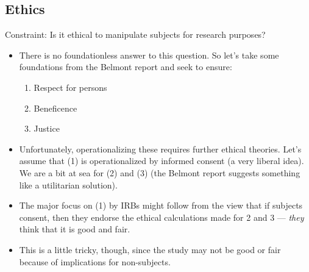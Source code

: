 \documentclass[
  11pt,
  ignorenonframetext,
]{beamer}
\providecommand{\tightlist}{%
  \setlength{\itemsep}{0pt}\setlength{\parskip}{0pt}}\usepackage{longtable,booktabs,array}
\begin{document}
\hypertarget{ethics}{%
\subsection{\texorpdfstring{Ethics
\label{ethics}}{Ethics }}\label{ethics}}

\begin{frame}{Constraint: Is it ethical to manipulate subjects for
research purposes?}
\protect\hypertarget{constraint-is-it-ethical-to-manipulate-subjects-for-research-purposes}{}
\begin{itemize}
\item
  There is no foundationless answer to this question. So let's take some
  foundations from the Belmont report and seek to ensure:

  \begin{enumerate}
  \tightlist
  \item
    Respect for persons
  \item
    Beneficence
  \item
    Justice
  \end{enumerate}
\item
  Unfortunately, operationalizing these requires further ethical
  theories. Let's assume that (1) is operationalized by informed consent
  (a very liberal idea). We are a bit at sea for (2) and (3) (the
  Belmont report suggests something like a utilitarian solution).
\item
  The major focus on (1) by IRBs might follow from the view that if
  subjects consent, then they endorse the ethical calculations made for
  2 and 3 --- \emph{they} think that it is good and fair.
\item
  This is a little tricky, though, since the study may not be good or
  fair because of implications for non-subjects.
\end{itemize}
\end{frame}
\end{document}
